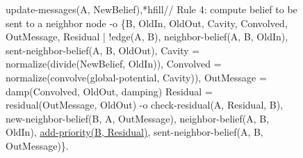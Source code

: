 \begin{figure}[h!]
\begin{LineCode}[commandchars=\\\{\}]
update-messages(A, NewBelief),*hfill// Rule 4: compute belief to be sent to a neighbor node
   -o \{B, OldIn, OldOut, Cavity, Convolved, OutMessage, Residual |
         !edge(A, B),
         neighbor-belief(A, B, OldIn),
         sent-neighbor-belief(A, B, OldOut),
         Cavity = normalize(divide(NewBelief, OldIn)),
         Convolved = normalize(convolve(global-potential, Cavity)),
         OutMessage = damp(Convolved, OldOut, damping)
         Residual = residual(OutMessage, OldOut)
         -o check-residual(A, Residual, B),
            new-neighbor-belief(B, A, OutMessage),
            neighbor-belief(A, B, OldIn),
            \underline{add-priority(B, Residual)},
            sent-neighbor-belief(A, B, OutMessage)\}.
\end{LineCode}
\label{code:coordination:improved_bp}
\end{figure}
